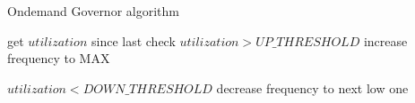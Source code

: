 \begin{algorithm}[t]
\caption{Ondemand Governor algorithm}
\label{algo:ondemand}
\begin{algorithmic}
{
\STATE get $utilization$ since last check
\STATE
{} $utilization > UP\_THRESHOLD$
\STATE \quad increase frequency to MAX

\STATE
{} $utilization < DOWN\_THRESHOLD$
\STATE {} decrease frequency to next low one
\ENDFOR
}
\end{algorithmic}
\end{algorithm}

\begin{comment}
repeat every sampling rate
	for every core in the CPU
		get utilization since last check
		if (utilization > UP_THRESHOLD)
			increase frequency to MAX
		elif (utilization < DOWN_THRESHOLD)
			decrease frequency to next low one


\end{comment}
